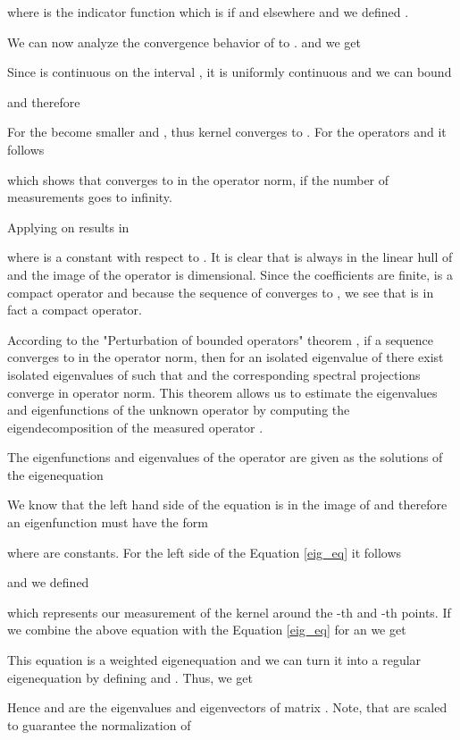 \documentclass[twoside,11pt]{article}
\begin{document}
where  is the indicator function which is  if 
and  elsewhere and we defined
.

\noindent We can now analyze the convergence behavior of  to .
 and  we get

Since  is continuous on the interval , it is uniformly continuous
and we can bound

and therefore

For  the  become smaller and ,
thus kernel  converges to .
For the operators  and  it follows

which shows that  converges to  in the operator norm,
if the number of measurements goes to infinity.

\noindent Applying  on  results in

where  is a constant with respect to .
It is clear that  is always in the linear hull of
 and the image of the operator
 is  dimensional.
Since the coefficients  are finite,  is a compact operator
and because the sequence of  converges to ,
we see that  is in fact a compact operator.

According to the "Perturbation of bounded operators" theorem \cite{DBLP:conf/colt/LuxburgBB04},
if a sequence  converges to  in the operator norm,
then for an isolated eigenvalue  of 
there exist isolated eigenvalues  of 
such that 
and the corresponding spectral projections converge in operator norm.
This theorem allows us to estimate the eigenvalues and eigenfunctions of
the unknown operator  by computing the eigendecomposition
of the measured operator .

The eigenfunctions and eigenvalues of the operator 
are given as the solutions of the eigenequation

We know that the left hand side of the equation is in the image of 
and therefore an eigenfunction  must have the form

where  are constants.
For the left side of the Equation \eqref{eig_eq} it follows

and we defined

which represents our measurement of the kernel  around the -th and -th points.
If we combine the above equation with the Equation \eqref{eig_eq} for an 
we get

This equation is a weighted eigenequation and we can turn it into a regular eigenequation
by defining 
and .
Thus, we get

Hence  and  are the eigenvalues and eigenvectors
of matrix .
Note, that  are scaled to guarantee the normalization of 
\end{document}
